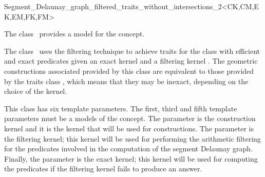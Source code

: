 


\begin{ccRefClass}
{Segment_Delaunay_graph_filtered_traits_without_intersections_2<CK,CM,EK,EM,FK,FM>}


\ccDefinition
  
The class \ccRefName\ provides a model for the
 concept.

The class \ccRefName\ uses the filtering technique \cite{cgal:bbp-iayed-01}
to achieve traits for the 
class with efficient and exact predicates given an exact
kernel  and a filtering kernel . The geometric
constructions associated provided by this class are equivalent
to those provided by the traits class
,
which means that they may be inexact, depending on the choice of the
 kernel.

This class has six template parameters. The first, third and fifth
template parameters must be a models of the  concept. The
parameter  is the construction kernel and it is the kernel
that will be used for constructions. The parameter  is the
filtering kernel; this kernel will be used for performing the
arithmetic filtering for the predicates involved in the computation of
the segment Delaunay graph. Finally, the parameter  is the
exact kernel; this kernel will be used for computing the predicates if
the filtering kernel fails to produce an answer.


\end{ccRefClass}
